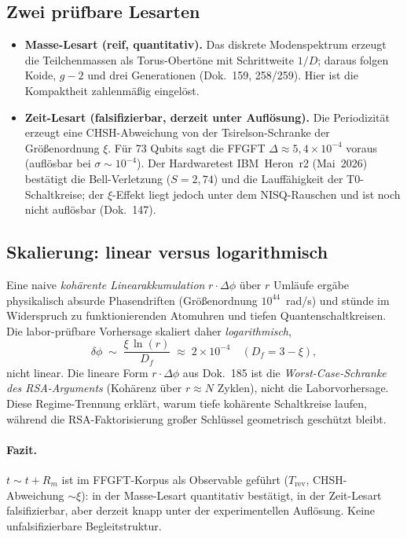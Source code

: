\subsection{Zwei pr\"ufbare Lesarten}
\begin{itemize}
  \item \textbf{Masse-Lesart (reif, quantitativ).} Das diskrete Modenspektrum
  erzeugt die Teilchenmassen als Torus-Obert\"one mit Schrittweite $1/D$; daraus
  folgen Koide, $g\!-\!2$ und drei Generationen (Dok.~159, 258/259). Hier ist
  die Kompaktheit zahlenm\"a\ss ig eingel\"ost.
  \item \textbf{Zeit-Lesart (falsifizierbar, derzeit unter Aufl\"osung).} Die
  Periodizit\"at erzeugt eine CHSH-Abweichung von der Tsirelson-Schranke der
  Gr\"o\ss enordnung $\xi$. F\"ur 73 Qubits sagt die FFGFT
  $\Delta \approx 5{,}4\times10^{-4}$ voraus (aufl\"osbar bei
  $\sigma\sim10^{-4}$). Der Hardwaretest IBM~Heron~r2 (Mai~2026) best\"atigt die
  Bell-Verletzung ($S=2{,}74$) und die Lauff\"ahigkeit der T0-Schaltkreise; der
  $\xi$-Effekt liegt jedoch unter dem NISQ-Rauschen und ist noch nicht
  aufl\"osbar (Dok.~147).
\end{itemize}

\subsection{Skalierung: linear versus logarithmisch}

\begin{important}
Eine naive \emph{koh\"arente Linearakkumulation} $r\cdot\Delta\phi$ \"uber $r$
Uml\"aufe erg\"abe physikalisch absurde Phasendriften (Gr\"o\ss enordnung
$10^{44}$~rad/s) und st\"unde im Widerspruch zu funktionierenden Atomuhren und
tiefen Quantenschaltkreisen. Die labor-pr\"ufbare Vorhersage skaliert daher
\emph{logarithmisch},
\[
  \delta\phi \;\sim\; \frac{\xi\,\ln(r)}{D_f}
  \;\approx\; 2\times10^{-4} \quad (D_f = 3-\xi),
\]
nicht linear. Die lineare Form $r\cdot\Delta\phi$ aus Dok.~185 ist die
\emph{Worst-Case-Schranke des RSA-Arguments} (Koh\"arenz \"uber $r\approx N$
Zyklen), nicht die Laborvorhersage. Diese Regime-Trennung erkl\"art, warum tiefe
koh\"arente Schaltkreise laufen, w\"ahrend die RSA-Faktorisierung gro\ss er
Schl\"ussel geometrisch gesch\"utzt bleibt.
\end{important}

\paragraph{Fazit.}
$t\sim t+R_m$ ist im FFGFT-Korpus als Observable gef\"uhrt ($T_\text{rev}$,
CHSH-Abweichung $\sim\xi$): in der Masse-Lesart quantitativ best\"atigt, in der
Zeit-Lesart falsifizierbar, aber derzeit knapp unter der experimentellen
Aufl\"osung. Keine unfalsifizierbare Begleitstruktur.

